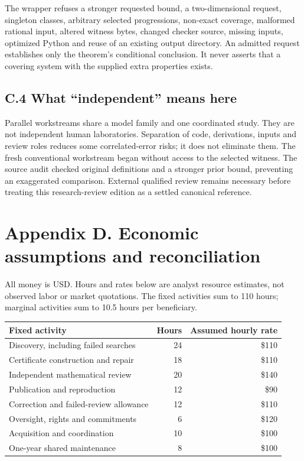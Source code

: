 \documentclass[11pt,a4paper]{article}
\begin{document}
The wrapper refuses a stronger requested bound, a two-dimensional
request, singleton classes, arbitrary selected progressions, non-exact
coverage, malformed rational input, altered witness bytes, changed
checker source, missing inputs, optimized Python and reuse of an
existing output directory. An admitted request establishes only the
theorem's conditional conclusion. It never asserts that a covering
system with the supplied extra properties exists.


\hypertarget{c.4-what-independent-means-here}{%
\subsection{C.4 What ``independent'' means
here}\label{c.4-what-independent-means-here}}

Parallel workstreams share a model family and one coordinated study.
They are not independent human laboratories. Separation of code,
derivations, inputs and review roles reduces some correlated-error
risks; it does not eliminate them. The fresh conventional workstream
began without access to the selected witness. The source audit checked
original definitions and a stronger prior bound, preventing an
exaggerated comparison. External qualified review remains necessary
before treating this research-review edition as a settled canonical
reference.


\hypertarget{appendix-d.-economic-assumptions-and-reconciliation}{%
\section{Appendix D. Economic assumptions and
reconciliation}\label{appendix-d.-economic-assumptions-and-reconciliation}}

All money is USD. Hours and rates below are analyst resource estimates,
not observed labor or market quotations. The fixed activities sum to 110
hours; marginal activities sum to 10.5 hours per beneficiary.

\begin{longtable}[]{@{}lrr@{}}
\toprule\noalign{}
Fixed activity & Hours & Assumed hourly rate \\
\midrule\noalign{}
\endhead
\bottomrule\noalign{}
\endlastfoot
Discovery, including failed searches & 24 & \$110 \\
Certificate construction and repair & 18 & \$110 \\
Independent mathematical review & 20 & \$140 \\
Publication and reproduction & 12 & \$90 \\
Correction and failed-review allowance & 12 & \$110 \\
Oversight, rights and commitments & 6 & \$120 \\
Acquisition and coordination & 10 & \$100 \\
One-year shared maintenance & 8 & \$100 \\
\end{longtable}
\end{document}
